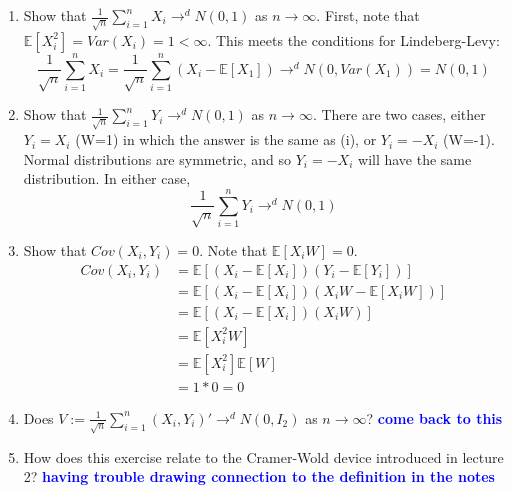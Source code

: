 \documentclass[]{article}
\newcommand{\sumin}{\sum\limits_{i=1}^n} %
\newcommand{\E}{\mathbb{E}}
\newcommand{\fix} [1] {\textbf{\textcolor{blue}{#1}}} %
\begin{document}
\begin{enumerate}[label = (\roman*)]

\item Show that $\frac{1}{\sqrt{n}} \sumin X_i \rightarrow^d N(0,1)$ as $n \rightarrow \infty$.
First, note that $\E[X_i^2] = Var(X_i) = 1 < \infty$. This meets the conditions for Lindeberg-Levy:
\[\frac{1}{\sqrt{n}} \sumin X_i = \frac{1}{\sqrt{n}}\sumin(X_i - \E[X_1]) 
\rightarrow^d N(0,Var(X_1)) = N(0,1)\]

\item Show that $\frac{1}{\sqrt{n}} \sumin Y_i \rightarrow^d N(0,1)$ as $n \rightarrow \infty$.
There are two cases, either $Y_i = X_i$ (W=1) in which the answer is the same as (i), or $Y_i = -X_i$ (W=-1). Normal distributions are symmetric, and so $Y_i = -X_i$ will have the same distribution. In either case, 
\[\frac{1}{\sqrt{n}} \sumin Y_i \rightarrow^d N(0,1)\]

\item Show that $Cov(X_i,Y_i) =0$.
Note that $\E[X_iW] = 0$.
\begin{align*}
Cov(X_i,Y_i) & = \E[(X_i - \E[X_i])(Y_i-\E[Y_i])]
\\
& = \E[(X_i - \E[X_i])(X_iW-\E[X_iW])]
\\
& = \E[(X_i - \E[X_i])(X_iW)]
\\
& = \E[ X_i^2W]
\\ 
& = \E[X_i^2]\E[W] 
\\
& = 1*0 = 0 
\end{align*}

\item Does $V := \frac{1}{\sqrt{n}} \sumin (X_i,Y_i)'\rightarrow^d N(0,I_2)$ as $n \rightarrow \infty$?
\fix{come back to this}

\item How does this exercise relate to the Cramer-Wold device introduced in lecture 2?
\fix{having trouble drawing connection to the definition in the notes}

\end{enumerate}
 
\end{document}
